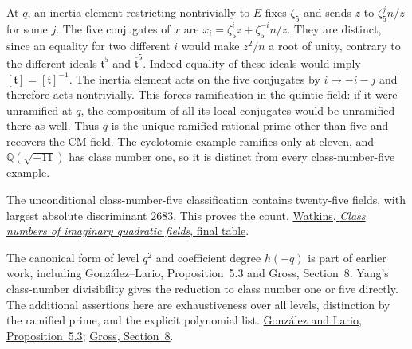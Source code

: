 At $q$, an inertia element restricting nontrivially to $E$ fixes
$\zeta_5$ and sends $z$ to $\zeta_5^j n/z$ for some $j$. The five
conjugates of $x$ are $x_i=\zeta_5^i z+\zeta_5^{-i}n/z$.
They are distinct, since an equality for two different $i$ would make
$z^2/n$ a root of unity, contrary to the different ideals
$\mathfrak t^5$ and $\overline{\mathfrak t}^{5}$.
Indeed equality of these ideals would imply $[\mathfrak t]=[\mathfrak
t]^{-1}$. The inertia element acts on the five conjugates by
$i\mapsto-i-j$ and therefore acts nontrivially. This forces
ramification in the quintic field: if it were unramified at $q$, the
compositum of all its local conjugates would be unramified there as
well. Thus $q$ is the unique ramified rational prime other than five
and recovers the CM field. The cyclotomic example ramifies only at
eleven, and $\mathbb Q(\sqrt{-11})$ has class number one, so it is
distinct from every class-number-five example.

The unconditional class-number-five classification contains twenty-five
fields, with largest absolute discriminant $2683$. This proves the
count. \href{https://magma.maths.usyd.edu.au/~watkins/papers/smallcn.pdf}{Watkins, \emph{Class numbers of imaginary quadratic fields}, final table}.

The canonical form of level $q^2$ and coefficient degree $h(-q)$ is
part of earlier work, including Gonz\'alez--Lario, Proposition~5.3 and Gross, Section~8.
Yang's class-number divisibility gives the reduction to class number one or
five directly. The additional assertions here are exhaustiveness over all
levels, distinction by the ramified prime, and the explicit polynomial list.
\href{https://arxiv.org/pdf/0810.4224}{Gonz\'alez and Lario, Proposition~5.3};
\href{https://people.math.harvard.edu/~gross/preprints/hecke.pdf}{Gross, Section~8}.
